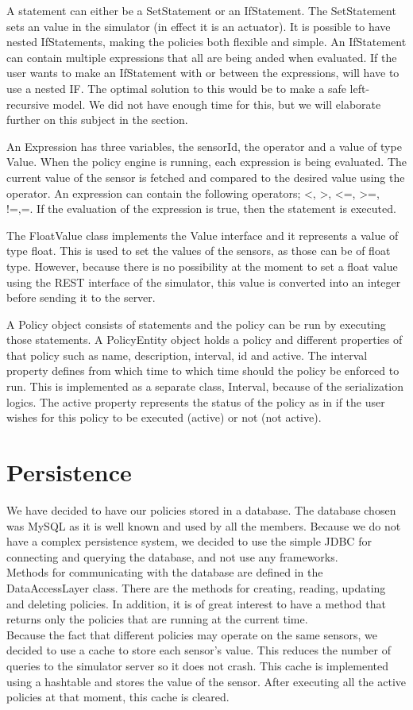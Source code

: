 A statement can either be a SetStatement or an IfStatement. The SetStatement sets an value in the simulator (in effect it is an actuator). It is possible to have nested IfStatements, making the policies both flexible and simple. An IfStatement can contain multiple expressions that all are being anded when evaluated. If the user wants to make an IfStatement with or between the expressions, will have to use a nested IF. The optimal solution to this would be to make a safe left-recursive model. We did not have enough time for this, but we will elaborate further on this subject in the  section. 

An Expression has three variables, the sensorId, the operator and a value of type Value. When the policy engine is running, each expression is being evaluated. The current value of the sensor is fetched and compared to the desired value using the operator. An expression can contain the following operators; <, >, <=, >=, !=,=. 
If the evaluation of the expression is true, then the statement is executed.

The FloatValue class implements the Value interface and it represents a value of type float. This is used to set the values of the sensors, as those can be of float type. However, because there is no possibility at the moment to set a float value using the REST interface of the simulator, this value is converted into an integer before sending it to the server.

A Policy object consists of statements and the policy can be run by executing those statements. A PolicyEntity object holds a policy and different properties of that policy such as name, description, interval, id and active. The interval property defines from which time to which time should the policy be enforced to run. This is implemented as a separate class, Interval, because of the serialization logics.  The active property represents the status of the policy as in if the user wishes for this policy to be executed (active) or not (not active).
\section{Persistence}
We have decided to have our policies stored in a database. The database chosen was MySQL as it is well known and used by all the members. Because we do not have a complex persistence system, we decided to use the simple JDBC for connecting and querying the database, and not use any frameworks. 
\\Methods for communicating with the database are defined in the DataAccessLayer class. There are the methods for creating, reading, updating and deleting policies. In addition, it is of great interest to have a method that returns only the policies that are running at the current time. 
\\Because the fact that different policies may operate on the same sensors, we decided to use a cache to store each sensor's value. This reduces the number of queries to the simulator server so it does not crash. This cache is implemented using a hashtable and stores the value of the sensor. After executing all the active policies at that moment, this cache is cleared. 
